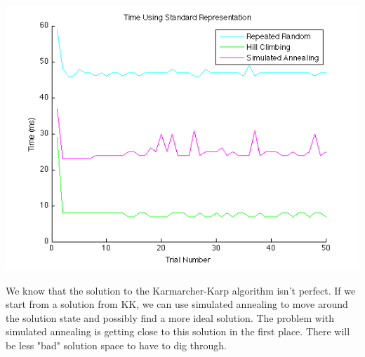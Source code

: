 \documentclass[solution, letterpaper]{cs124}
\begin{document}
\includegraphics[scale=0.50]{fig-time-stand.png}


\problem{}
We know that the solution to the Karmarcher-Karp algorithm isn't perfect. If we start from a solution from KK, we can use simulated annealing to move around the solution state and possibly find a more ideal solution. The problem with simulated annealing is getting close to this solution in the first place. There will be less "bad" solution space to have to dig through. 



\end{document}
